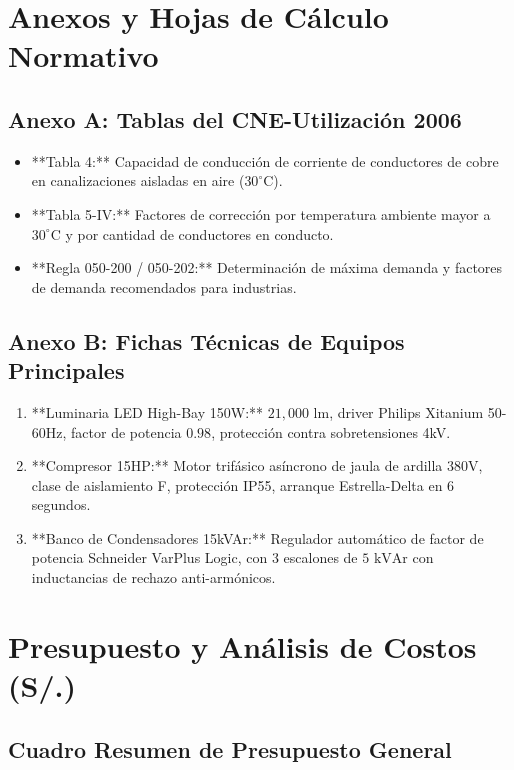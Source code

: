 \chapter{Anexos y Hojas de Cálculo Normativo}

\section{Anexo A: Tablas del CNE-Utilización 2006}
\begin{itemize}
    \item **Tabla 4:** Capacidad de conducción de corriente de conductores de cobre en canalizaciones aisladas en aire ($30^\circ\text{C}$).
    \item **Tabla 5-IV:** Factores de corrección por temperatura ambiente mayor a $30^\circ\text{C}$ y por cantidad de conductores en conducto.
    \item **Regla 050-200 / 050-202:** Determinación de máxima demanda y factores de demanda recomendados para industrias.
\end{itemize}

\section{Anexo B: Fichas Técnicas de Equipos Principales}
\begin{enumerate}
    \item **Luminaria LED High-Bay 150W:** $21,000\text{ lm}$, driver Philips Xitanium 50-60Hz, factor de potencia $0.98$, protección contra sobretensiones 4kV.
    \item **Compresor 15HP:** Motor trifásico asíncrono de jaula de ardilla $380\text{V}$, clase de aislamiento F, protección IP55, arranque Estrella-Delta en 6 segundos.
    \item **Banco de Condensadores 15kVAr:** Regulador automático de factor de potencia Schneider VarPlus Logic, con 3 escalones de $5\text{ kVAr}$ con inductancias de rechazo anti-armónicos.
\end{enumerate}

\chapter{Presupuesto y Análisis de Costos (S/.)}

\section{Cuadro Resumen de Presupuesto General}


